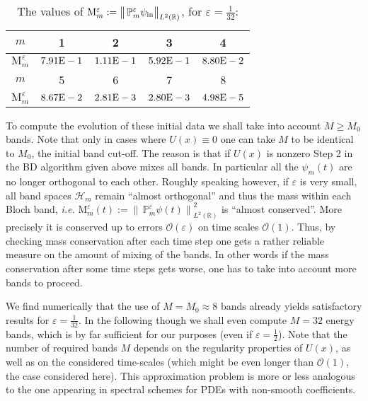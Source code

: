 \documentclass[leqno,final]{siamltex}
\numberwithin{equation}{section}
\newcounter{me}
\begin{document}
\begin{table}[htbp]
\caption{The values of $\mathrm M_{m}^{{\varepsilon }}:={\big \| \, \mathbb
P^{{\varepsilon }}_m \psi_{\rm in} \big\|}_{L^2({{\mathbb R}})}$, for
${{\varepsilon }}=\frac{1}{32}$:}\label{tab_energy}\vspace{-1mm}
\begin{center}\footnotesize

\begin{tabular}{ccccc}
\hline $m$ & 1 & 2& 3& 4\\ \hline ${\mathrm M}^{{\varepsilon }}_m$
&     $7.91{\rm{E}}-1$
&     $1.11{\rm{E}}-1$
&     $5.92{\rm{E}}-1$
&     $8.80{\rm{E}}-2$
\\ \hline $m$ & 5& 6& 7& 8\\ \hline ${\mathrm M}^{{\varepsilon }}_m$
&     $8.67{\rm{E}}-2$
&     $2.81{\rm{E}}-3$
&     $2.80{\rm{E}}-3$
&     $4.98{\rm{E}}-5$
\\ \hline
\end{tabular}
\end{center}
\end{table}

To compute the evolution of these initial data we shall take into
account $M\geq M_0$ bands. Note that only in cases where
$U(x)\equiv 0$ one can take $M$ to be identical to $M_0$, the
initial band cut-off. The reason is that if $U(x)$ is nonzero Step
2 in the BD algorithm given above mixes all bands. In particular
all the $\psi_m(t)$ are no longer orthogonal to each other.
Roughly speaking however, if ${{\varepsilon }}$ is very small, all band spaces
$\mathcal H_m$ remain ``almost orthogonal'' and thus the mass
within each Bloch band, {{\sl i.e.\/ }} $\mathrm M_m^{{\varepsilon }}(t):={\big \| \,
\mathbb P^{{\varepsilon }}_m \psi(t) \big\|}^2_{L^2({{\mathbb R}})}$ is ``almost
conserved''. More precisely it is conserved up to errors ${\mathcal O}({{\varepsilon }})$
on time scales ${\mathcal O}(1)$. Thus, by checking mass conservation after
each time step one gets a rather reliable measure on the amount of
mixing of the bands. In other words if the mass conservation after
some time steps gets worse, one has to take into account more
bands to proceed.

We find numerically that the use of $M = M_0 \approx 8$ bands
already yields satisfactory results for ${{\varepsilon }} = \frac{1}{32}$. In
the following though we shall even compute  $M = 32$ energy bands,
which is by far sufficient for our purposes (even if ${{\varepsilon }} =
\frac{1}{2}$). Note that the number of required bands $M$ depends
on the regularity properties of $U(x)$, as well as on the
considered time-scales (which might be even longer than ${\mathcal O}(1)$,
the case considered here). This approximation problem is more or
less analogous to the one appearing in spectral schemes for PDEs
with non-smooth coefficients.
\end{document}
